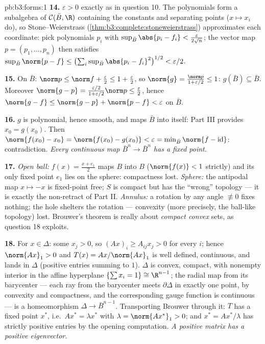 \begin{solution}{pb:b3:forms:1}
\textbf{14.} $\varepsilon > 0$ exactly as in question 10.
The polynomials form a subalgebra of $\mathcal C(\bar B,
\R)$ containing the constants and separating points ($x
\mapsto x_i$ do), so Stone--Weierstrass
(\cref{thm:b3:complete:stoneweierstrass}) approximates each
coordinate: pick polynomials $p_i$ with $\sup_{\bar
B}\abs{p_i - f_i} < \frac{\varepsilon}{2\sqrt n}$; the
vector map $p = (p_1, \dots, p_n)$ then satisfies
$\sup_{\bar B}\norm{p - f} \leq
\bigl(\sum_i\sup_{\bar B}\abs{p_i - f_i}^2\bigr)^{1/2} <
\varepsilon/2$.

\textbf{15.} On $\bar B$: $\norm p \leq \norm f +
\frac\varepsilon2 \leq 1 + \frac\varepsilon2$, so
$\norm{g} = \frac{\norm p}{1 + \varepsilon/2} \leq 1$:
$g(\bar B) \subseteq \bar B$. Moreover $\norm{g - p} =
\frac{\varepsilon/2}{1 + \varepsilon/2}\norm p \leq
\frac\varepsilon2$, hence $\norm{g - f} \leq \norm{g - p} +
\norm{p - f} < \varepsilon$ on $\bar B$.

\textbf{16.} $g$ is polynomial, hence smooth, and maps
$\bar B$ into itself: Part III provides $x_0 = g(x_0)$.
Then $\norm{f(x_0) - x_0} = \norm{f(x_0) - g(x_0)} <
\varepsilon = \min_{\bar B}\norm{f - \operatorname{id}}$:
contradiction. \emph{Every continuous map $\bar B^n \to
\bar B^n$ has a fixed point.}

\textbf{17.} \emph{Open ball:} $f(x) = \frac{x + e_1}2$ maps
$B$ into $B$ ($\norm{f(x)} < 1$ strictly) and its only fixed
point $e_1$ lies on the sphere: compactness lost.
\emph{Sphere:} the antipodal map $x \mapsto -x$ is
fixed-point free; $S$ is compact but has the ``wrong''
topology --- it is exactly the non-retract of Part II.
\emph{Annulus:} a rotation by any angle $\not\equiv 0$ fixes
nothing; the hole shelters the rotation --- convexity (more
precisely, the ball-like topology) lost. Brouwer's theorem
is really about \emph{compact convex} sets, as question 18
exploits.

\textbf{18.} For $x \in \Delta$: some $x_j > 0$, so $(Ax)_i
\geq A_{ij}x_j > 0$ for every $i$; hence $\norm{Ax}_1 > 0$
and $T(x) = Ax/\norm{Ax}_1$ is well defined, continuous, and
lands in $\Delta$ (positive entries summing to $1$).
$\Delta$ is convex, compact, with nonempty interior in the
affine hyperplane $\{\sum x_i = 1\} \cong \R^{n-1}$; the
radial map from its barycenter --- each ray from the
barycenter meets $\partial\Delta$ in exactly one point, by
convexity and compactness, and the corresponding gauge
function is continuous --- is a homeomorphism $\Delta \to
\bar B^{n-1}$. Transporting Brouwer through it: $T$ has a
fixed point $x^*$, i.e.\ $Ax^* = \lambda x^*$ with $\lambda
= \norm{Ax^*}_1 > 0$; and $x^* = Ax^*/\lambda$ has strictly
positive entries by the opening computation. \emph{A
positive matrix has a positive eigenvector.}


\end{solution}

